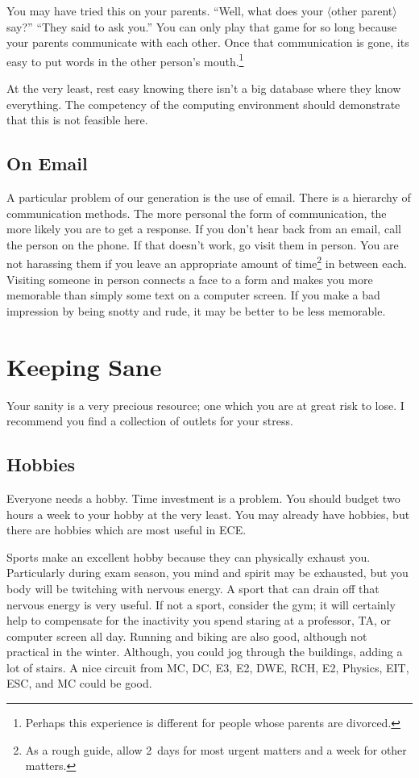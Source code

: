 \documentclass{book}
\begin{document}
You may have tried this on your parents. ``Well, what does your $\langle$other parent$\rangle$ say?'' ``They said to ask you.'' You can only play that game for so long because your parents communicate with each other. Once that communication is gone, its easy to put words in the other person's mouth.\footnote{Perhaps this experience is different for people whose parents are divorced.}

At the very least, rest easy knowing there isn't a big database where they know everything. The competency of the computing environment should demonstrate that this is not feasible here.

\section{On Email}
A particular problem of our generation is the use of email. There is a hierarchy of communication methods. The more personal the form of communication, the more likely you are to get a response. If you don't hear back from an email, call the person on the phone. If that doesn't work, go visit them in person. You are not harassing them if you leave an appropriate amount of time\footnote{As a rough guide, allow 2~days for most urgent matters and a week for other matters.} in between each. Visiting someone in person connects a face to a form and makes you more memorable than simply some text on a computer screen. If you make a bad impression by being snotty and rude, it may be better to be less memorable.

\chapter{Keeping Sane}
Your sanity is a very precious resource; one which you are at great risk to lose. I recommend you find a collection of outlets for your stress.

\section{Hobbies}
Everyone needs a hobby. Time investment is a problem. You should budget two hours a week to your hobby at the very least. You may already have hobbies, but there are hobbies which are most useful in ECE.

Sports make an excellent hobby because they can physically exhaust you. Particularly during exam season, you mind and spirit may be exhausted, but you body will be twitching with nervous energy. A sport that can drain off that nervous energy is very useful. If not a sport, consider the gym; it will certainly help to compensate for the inactivity you spend staring at a professor, TA, or computer screen all day. Running and biking are also good, although not practical in the winter. Although, you could jog through the buildings, adding a lot of stairs. A nice circuit from MC, DC, E3, E2, DWE, RCH, E2, Physics, EIT, ESC, and MC could be good.
\end{document}
